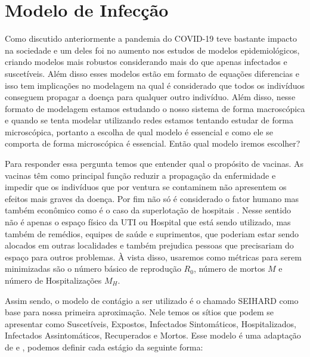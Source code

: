 \section{Modelo de Infecção}

Como discutido anteriormente a pandemia do COVID-19 teve bastante impacto na sociedade e um deles foi no aumento nos estudos de modelos epidemiológicos, criando modelos mais robustos \cite{Xiang2021} considerando mais do que apenas infectados e suscetíveis. Além disso esses modelos estão em formato de equações diferencias e isso tem implicações no modelagem na qual é considerado que todos os indivíduos conseguem propagar a doença para qualquer outro indivíduo. Além disso, nesse formato de modelagem estamos estudando o nosso sistema de forma macroscópica e quando se tenta modelar utilizando redes estamos tentando estudar de forma microscópica, portanto a escolha de qual modelo é essencial e como ele se comporta de forma microscópica é essencial. Então qual modelo iremos escolher?

Para responder essa pergunta temos que entender qual o propósito de vacinas. As vacinas têm como principal função reduzir a propagação da enfermidade e impedir que os indivíduos que por ventura se contaminem não apresentem os efeitos mais graves da doença. Por fim não só é considerado o fator humano mas também econômico como é o caso da superlotação de hospitais \cite{French2021}. Nesse sentido não é apenas o espaço físico da UTI ou Hospital que está sendo utilizado, mas também de remédios, equipes de saúde e suprimentos, que poderiam estar sendo alocados em outras localidades e também prejudica pessoas que precisariam do espaço para outros problemas. À vista disso, usaremos como métricas para serem minimizadas são o número básico de reprodução $R_0$, número de mortos $M$ e número de Hospitalizações $M_H$.

Assim sendo, o modelo de contágio a ser utilizado é o chamado SEIHARD como base para nossa primeira aproximação. Nele temos os sítios que podem se apresentar como Suscetíveis, Expostos, Infectados Sintomáticos, Hospitalizados, Infectados Assintomáticos, Recuperados e Mortos. Esse modelo é uma adaptação de \cite{Eikenberry2020} e \cite{SEIHR}, podemos definir cada estágio da seguinte forma:


